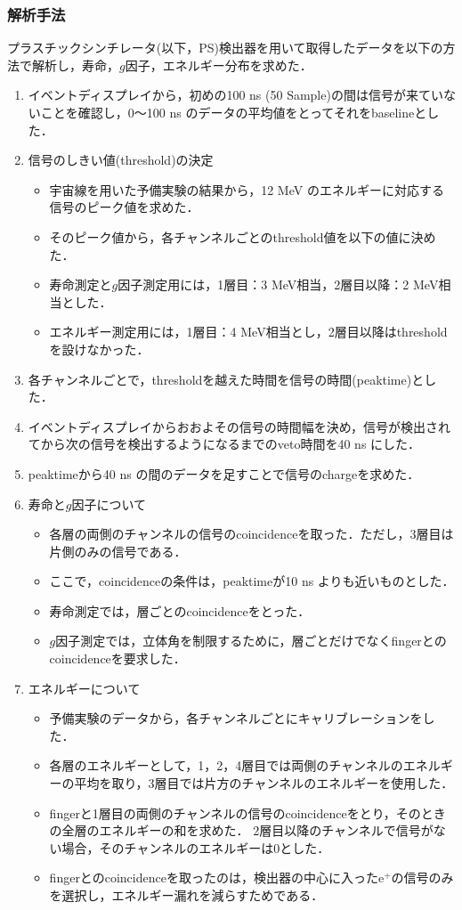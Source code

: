 \subsubsection{解析手法}
プラスチックシンチレータ(以下，PS)検出器を用いて取得したデータを以下の方法で解析し，寿命，$g$因子，エネルギー分布を求めた．
\begin{enumerate}
\item イベントディスプレイから，初めの100 ns (50 Sample)の間は信号が来ていないことを確認し，0〜100 ns のデータの平均値をとってそれをbaselineとした．
\item 信号のしきい値(threshold)の決定
\begin{itemize}
\item 宇宙線を用いた予備実験の結果から，12 MeV のエネルギーに対応する信号のピーク値を求めた．
\item そのピーク値から，各チャンネルごとのthreshold値を以下の値に決めた．
\item 寿命測定と$g$因子測定用には，1層目：3 MeV相当，2層目以降：2 MeV相当とした．
\item エネルギー測定用には，1層目：4 MeV相当とし，2層目以降はthresholdを設けなかった．
\end{itemize}
\item 各チャンネルごとで，thresholdを越えた時間を信号の時間(peaktime)とした．
\item イベントディスプレイからおおよその信号の時間幅を決め，信号が検出されてから次の信号を検出するようになるまでのveto時間を40 ns にした．
\item peaktimeから40 ns の間のデータを足すことで信号のchargeを求めた．
\item 寿命と$g$因子について
\begin{itemize}
\item 各層の両側のチャンネルの信号のcoincidenceを取った．ただし，3層目は片側のみの信号である．
\item ここで，coincidenceの条件は，peaktimeが10 ns よりも近いものとした．
\item 寿命測定では，層ごとのcoincidenceをとった．
\item $g$因子測定では，立体角を制限するために，層ごとだけでなくfingerとのcoincidenceを要求した．
\end{itemize}
\item エネルギーについて
\begin{itemize}
\item 予備実験のデータから，各チャンネルごとにキャリブレーションをした．
\item 各層のエネルギーとして，1，2，4層目では両側のチャンネルのエネルギーの平均を取り，3層目では片方のチャンネルのエネルギーを使用した．
\item fingerと1層目の両側のチャンネルの信号のcoincidenceをとり，そのときの全層のエネルギーの和を求めた．
2層目以降のチャンネルで信号がない場合，そのチャンネルのエネルギーは0とした．
\item fingerとのcoincidenceを取ったのは，検出器の中心に入ったe$^{+}$の信号のみを選択し，エネルギー漏れを減らすためである．
\end{itemize}
\end{enumerate}

